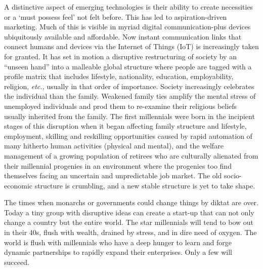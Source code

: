 \begin{multicols}{2}
A distinctive aspect of emerging technologies is their ability to create necessities or a ‘must possess feel' not felt before. This has led to aspiration-driven marketing. Much of this is visible in myriad digital communication-plus devices ubiquitously available and affordable. Now instant communication links that connect humans and devices via the Internet of Things (IoT) is increasingly taken for granted. It has set in motion a disruptive restructuring of society by an “unseen hand” into a malleable global structure where people are tagged with a profile matrix that includes lifestyle, nationality, education, employability, religion, \textit{etc.,} usually in that order of importance. Society increasingly celebrates the individual than the family. Weakened family ties amplify the mental stress of unemployed individuals and prod them to re-examine their religious beliefs usually inherited from the family. The first millennials were born in the incipient stages of this disruption when it began affecting family structure and lifestyle, employment, skilling and reskilling opportunities caused by rapid automation of many hitherto human activities (physical and mental), and the welfare management of a growing population of retirees who are culturally alienated from their millennial progenies in an environment where the progenies too find themselves facing an uncertain and unpredictable job market. The old socio-economic structure is crumbling, and a new stable structure is yet to take shape.

The times when monarchs or governments could change things by diktat are over. Today a tiny group with disruptive ideas can create a start-up that can not only change a country but the entire world. The star millennials will tend to bow out in their 40s, flush with wealth, drained by stress, and in dire need of oxygen. The world is flush with millennials who have a deep hunger to learn and forge dynamic partnerships to rapidly expand their enterprises. Only a few will succeed.
\end{multicols}

